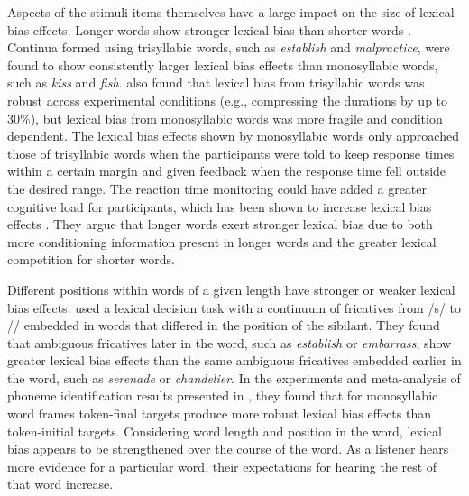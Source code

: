 Aspects of the stimuli items themselves have a large impact on the size of lexical bias effects.
Longer words show stronger lexical bias than shorter words \citep{Pitt2006}.  
Continua formed using trisyllabic words, such as \emph{establish} and \emph{malpractice}, were found to show consistently larger lexical bias effects than monosyllabic words, such as \emph{kiss} and \emph{fish}.  
\citet{Pitt2006} also found that lexical bias from trisyllabic words was robust across experimental conditions (e.g., compressing the durations by up to 30\%), but lexical bias from monosyllabic words was more fragile and condition dependent.
The lexical bias effects shown by monosyllabic words only approached those of trisyllabic words when the participants were told to keep response times within a certain margin and given feedback when the response time fell outside the desired range.
The reaction time monitoring could have added a greater cognitive load for participants, which has been shown to increase lexical bias effects \citep{Mattys2011}.
They argue that longer words exert stronger lexical bias due to both more conditioning information present in longer words and the greater lexical competition for shorter words.

Different positions within words of a given length have stronger or weaker lexical bias effects.
\citet{Pitt2012} used a lexical decision task with a continuum of fricatives from /s/ to /\textesh/ embedded in words that differed in the position of the sibilant.  
They found that ambiguous fricatives later in the word, such as \emph{establish} or \emph{embarrass}, show greater lexical bias effects than the same ambiguous fricatives embedded earlier in the word, such as \emph{serenade} or \emph{chandelier}.
In the experiments and meta-analysis of phoneme identification results presented in \citet{Pitt1993}, they found that for monosyllabic word frames token-final targets produce more robust lexical bias effects than token-initial targets.
Considering word length and position in the word, lexical bias appears to be strengthened over the course of the word.
As a listener hears more evidence for a particular word, their expectations for hearing the rest of that word increase.

